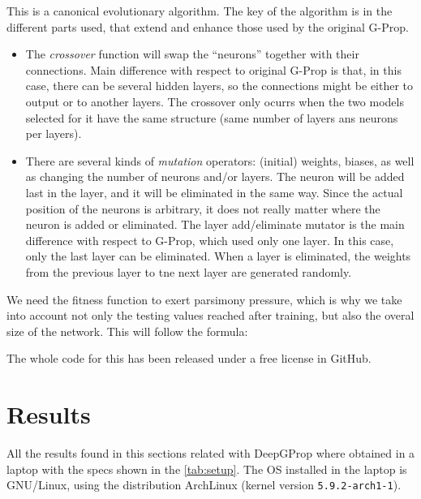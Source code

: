 \documentclass[runningheads]{llncs}
\begin{document}
This is a canonical evolutionary algorithm. The key of the algorithm is
in the different parts used, that extend and enhance those used by the
original G-Prop. \begin{itemize}

  \item The {\em crossover} function will swap the ``neurons'' together with
    their connections. Main difference with respect to original G-Prop is that,
    in this case, there can be several hidden layers, so the connections might
    be either to output or to another layers. The crossover only ocurrs when
    the two models selected for it have the same structure (same number of
    layers ans neurons per layers).

  \item There are several kinds of {\em mutation} operators: (initial) weights,
    biases, as well as changing the number of neurons and/or
    layers. The neuron will be added last in the layer, and it will be
    eliminated in the same way. Since the actual position of the
    neurons is arbitrary, it does not really matter where the neuron
    is added or eliminated. The layer add/eliminate mutator is the
    main difference with respect to G-Prop, which used only one
    layer. In this case, only the last layer can be eliminated. When a
    layer is eliminated, the weights from the previous layer to tne
    next layer are generated randomly.
\end{itemize}

We need the fitness function to exert parsimony pressure, which is why
we take into account not only the testing values reached after
training, but also the overal size of the network. This will follow
the formula:



The whole code for this has been released under a free license in
GitHub. %

\section{Results}
\label{sec:res}


All the results found in this sections related with DeepGProp
\cite{deep-g-prop} where obtained in a laptop with the specs shown in the
\autoref{tab:setup}. The OS installed in the laptop is GNU/Linux, using the
distribution ArchLinux (kernel version \texttt{5.9.2-arch1-1}).
\end{document}
